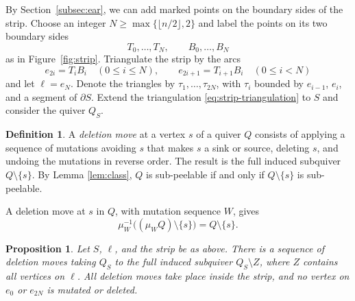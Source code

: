 \documentclass[12pt, letter]{amsart}
\newtheorem{proposition}[theorem]{Proposition}
\theoremstyle{definition}
\newtheorem{definition}[theorem]{Definition}
\numberwithin{equation}{section}
\begin{document}
By Section~\ref{subsec:ear}, we can add marked points on the boundary sides of the strip. Choose an integer
$ N\ge\max\{\lfloor n/2\rfloor,2\}$ and label the points on its
two boundary sides
\[
  T_0,\ldots,T_{N},\qquad B_0,\ldots,B_{N}
\]
as in Figure~\ref{fig:strip}. 
Triangulate the strip by the arcs
\begin{equation}\label{eq:strip-triangulation}
 e_{2i}=T_iB_i\quad(0\le i\le N),\qquad
 e_{2i+1}=T_{i+1}B_i\quad(0\le i<N)
\end{equation}
and let \(\ell= e_N\).
Denote the triangles by
$\tau_1,\ldots,\tau_{2N}$, with $\tau_i$ bounded by
$e_{i-1}$, $e_i$, and a segment of $\partial S$.
Extend the triangulation \eqref{eq:strip-triangulation} to $S$ and consider the quiver \(Q_S\). 

\begin{definition}
A \emph{deletion move} at a vertex $s$ of a quiver \(Q\) consists of applying
a sequence of mutations avoiding $s$ that makes $s$ a sink
or source, deleting $s$, and undoing the mutations in reverse order.
The result is the full induced subquiver $Q\setminus\{s\}$. By Lemma \ref{lem:class}, $Q$ is sub-peelable if and only if
$Q\setminus\{s\}$ is sub-peelable.
\end{definition}


A deletion move at $s$ in $Q$, with mutation sequence $W$, gives
\begin{equation}\label{eq:delete-undo}
 \mu_W^{-1}\bigl((\mu_W Q)\setminus\{s\}\bigr)
       =Q\setminus\{s\}.
\end{equation}


\begin{proposition}\label{prop:strip}
Let $S$, $\ell$, and the strip be as above.
There is a sequence of deletion moves taking $Q_S$ to
the full induced subquiver $Q_S\setminus Z$, where $Z$
contains all vertices on $\ell$.
All deletion moves take place inside the strip, and
no vertex on $e_0$ or $e_{2N}$ is mutated or deleted.
\end{proposition}
\end{document}
